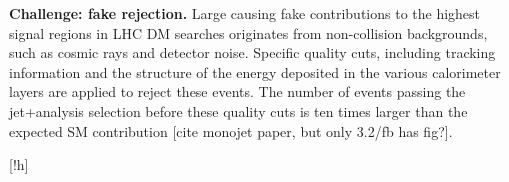 \begin{textbox}[!h]
\textbf{Challenge: fake \MET rejection.} 
Large \MET causing fake contributions to the highest signal regions in LHC DM searches
originates from non-collision backgrounds, such as cosmic rays and detector noise. Specific
quality cuts, including tracking information and the structure of the energy deposited 
in the various calorimeter layers are applied to reject these events. 
The number of events passing the jet+\MET analysis selection before these quality cuts
is ten times larger than the expected SM contribution [cite monojet paper, but only 3.2/fb has fig?].  

\end{textbox}[!h]







